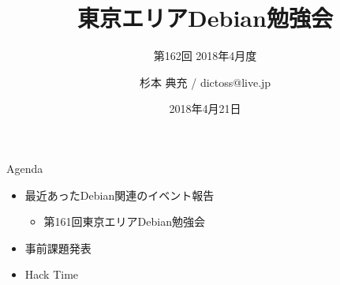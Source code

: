 \title{東京エリアDebian勉強会}
\subtitle{第162回 2018年4月度}
\author{杉本 典充 / dictoss@live.jp}
\date{2018年4月21日}



\begin{frame}
\titlepage{}
\end{frame}

\begin{frame}{Agenda}
 \begin{minipage}[t]{0.45\hsize}
  \begin{itemize}
  \item 最近あったDebian関連のイベント報告
    \begin{itemize}
    \item 第161回東京エリアDebian勉強会
    \end{itemize}
  \item 事前課題発表
  \end{itemize}
 \end{minipage}
 \begin{minipage}[t]{0.45\hsize}
  \begin{itemize}
  \item Hack Time
  \end{itemize}
 \end{minipage}
\end{frame}

